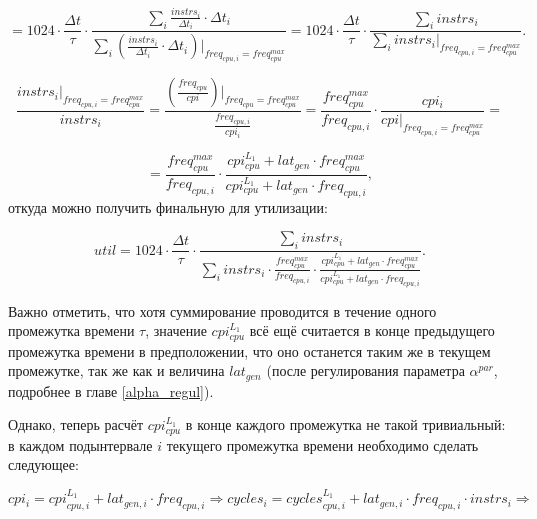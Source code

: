     \begin{equation*}
        = 1024 \cdot \frac{\Delta t}{\tau} \cdot
        \frac{\sum \limits_i \frac{instrs_i}{\Delta t_i} \cdot \Delta t_i}
             {\sum \limits_i (\frac{instrs_i}{\Delta t_i} \cdot \Delta t_i) |_{freq_{cpu, i} = freq_{cpu}^{max}}} =
        1024 \cdot \frac{\Delta t}{\tau} \cdot
        \frac{\sum \limits_i instrs_i}
             {\sum \limits_i instrs_i |_{freq_{cpu, i} = freq_{cpu}^{max}}}.
    \end{equation*}

    \begin{equation}
        \frac{instrs_i |_{freq_{cpu, i} = freq_{cpu}^{max}}}{instrs_i} =
            \frac{(\frac{freq_{cpu}}{cpi}) |_{freq_{cpu} = freq_{cpu}^{max}}}{\frac{freq_{cpu, i}}{cpi_i}} =
            \frac{freq_{cpu}^{max}}{freq_{cpu, i}} \cdot \frac{cpi_i}{cpi |_{freq_{cpu, i} = freq_{cpu}^{max}}} =
    \end{equation}

    \begin{equation*}
        = \frac{freq_{cpu}^{max}}{freq_{cpu, i}} \cdot \frac{cpi_{cpu}^{L_1} + lat_{gen} \cdot freq_{cpu}^{max}}
            {cpi_{cpu}^{L_1} + lat_{gen} \cdot freq_{cpu, i}},
    \end{equation*}
    откуда можно получить финальную для утилизации:

    \begin{equation} \label{util_sum_final}
        util = 1024 \cdot \frac{\Delta t}{\tau} \cdot \frac{\sum \limits_i instrs_i}
            {\sum \limits_i instrs_i \cdot \frac{freq_{cpu}^{max}}{freq_{cpu, i}} \cdot
            \frac{cpi_{cpu}^{L_1} + lat_{gen} \cdot freq_{cpu}^{max}}{cpi_{cpu}^{L_1} + lat_{gen} \cdot freq_{cpu, i}}}.
    \end{equation}

    Важно отметить, что хотя суммирование проводится в течение одного промежутка времени $\tau$,
    значение $cpi_{cpu}^{L_1}$ всё ещё считается в конце предыдущего промежутка времени в
    предположении, что оно останется таким же в текущем промежутке, так же как и величина $lat_{gen}$
    (после регулирования параметра $\alpha^{par}$, подробнее в главе \ref{alpha_regul}).

    Однако, теперь расчёт $cpi_{cpu}^{L_1}$ в конце каждого промежутка не такой тривиальный: в
    каждом подынтервале $i$ текущего промежутка времени необходимо сделать следующее:

    \begin{equation}
        cpi_i = cpi_{cpu, i}^{L_1} + lat_{gen, i} \cdot freq_{cpu, i} \Rightarrow
            cycles_i = cycles_{cpu, i}^{L_1} + lat_{gen, i} \cdot freq_{cpu, i} \cdot instrs_i \Rightarrow
    \end{equation}

